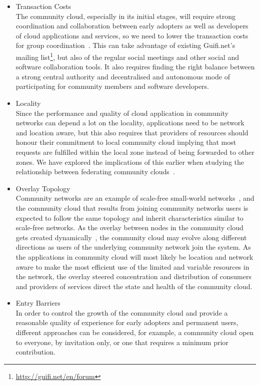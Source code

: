 \begin{itemize}
\item Transaction Costs
\\
The community cloud, especially in its initial stages, will require strong coordination and collaboration between early adopters as well as developers of cloud applications and services, so we need to lower the transaction costs for group coordination~\cite{Coase1937}.
This can take advantage of existing Guifi.net's mailing list\footnote{\url{http://guifi.net/en/forum}}, but also of the regular social meetings and other social and software collaboration tools.
It also requires finding the right balance between a strong central authority and decentralised and autonomous mode of participating for community members and software developers.


\item Locality
\\
Since the performance and quality of cloud application in community networks can depend a lot on the locality, applications need to be network and location aware, but this also requires that providers of resources should honour their commitment to local community cloud implying that most requests are fulfilled within the local zone instead of being forwarded to other zones.
We have explored the implications of this earlier when studying the relationship between federating community clouds~\cite{Khan2013TowardsIncentives, Khan2014Prototyping}.


\item Overlay Topology
\\
Community networks are an example of scale-free small-world networks~\cite{Vega2012}, and the community cloud that results from joining community networks users is expected to follow the same topology and inherit characteristics similar to scale-free networks. 
As the overlay between nodes in the community cloud gets created dynamically~\cite{Nakao2010}, the community cloud may evolve along different directions as users of the underlying community network join the system. 
As the applications in community cloud will most likely be location and network aware to make the most efficient use of the limited and variable resources in the network, the overlay steered concentration and distribution of consumers and providers of services direct the state and health of the community cloud.


\item Entry Barriers
\\
In order to control the growth of the community cloud and provide a reasonable quality of experience for early adopters and permanent users, different approaches can be considered, for example, a community cloud open to everyone, by invitation only, or one that requires a minimum prior contribution.



\end{itemize}
